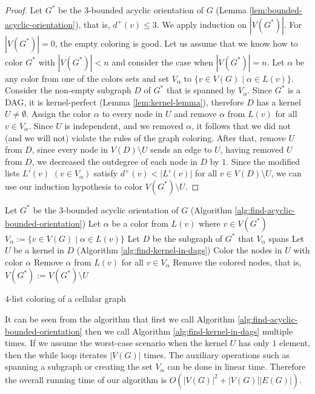 \documentclass[a4paper, 12pt]{article}
\begin{document}
\begin{proof}
Let $G^*$ be the $3$-bounded acyclic orientation of $G$ (Lemma \ref{lem:bounded-acyclic-orientation}), that is, $d^+(v) \leqslant 3$. We apply induction on $|V(G^*)|$. For $|V(G^*)|=0$, the empty coloring is good. Let us assume that we know how to color $G^*$ with $|V(G^*)| < n$ and consider the case when $|V(G^*)|=n$. Let $\alpha$ be any color from one of the colors sets and set $V_\alpha$ to $\lbrace v \in V(G) \mid \alpha \in L(v) \rbrace$. Consider the non-empty subgraph $D$ of $G^*$ that is spanned by $V_\alpha$. Since $G^*$ is a DAG, it is kernel-perfect (Lemma \ref{lem:kernel-lemma}), therefore $D$ has a kernel $U \neq \emptyset$. Assign the color $\alpha$ to every node in $U$ and remove $\alpha$ from $L(v)$ for all $v \in V_\alpha$. Since $U$ is independent, and we removed $\alpha$, it follows that we did not (and we will not) violate the rules of the graph coloring. After that, remove $U$ from $D$, since every node in $V(D) \setminus U$ sends an edge to $U$, having removed $U$ from $D$, we decreased the outdegree of each node in $D$ by $1$. Since the modified lists $L'(v)$ $(v \in V_\alpha)$ satisfy $d^+(v) < |L'(v)|$ for all $v \in V(D) \setminus U$, we can use our induction hypothesis to color $V(G^*) \setminus U$.
\end{proof}
\begin{algorithm}\label{alg:four-list-coloring}
  Let $G^*$ be the $3$-bounded acyclic orientation of $G$ (Algorithm \ref{alg:find-acyclic-bounded-orientation})\;
   {
  	Let $\alpha$ be a color from $L(v)$ where $v \in V(G^*)$\;
  	$V_\alpha := \lbrace v \in V(G) \mid \alpha \in L(v) \rbrace$\;
  	Let $D$ be the subgraph of $G^*$ that $V_\alpha$ spans\;
  	Let $U$ be a kernel in $D$ (Algorithm \ref{alg:find-kernel-in-dags})\;
  	Color the nodes in $U$ with color $\alpha$\;
  	Remove $\alpha$ from $L(v)$ for all $v \in V_\alpha$\;
  	Remove the colored nodes, that is, $V(G^*) := V(G^*) \setminus U$\;
  }
 \caption{$4$-list coloring of a cellular graph}
\end{algorithm}

It can be seen from the algorithm that first we call Algorithm \ref{alg:find-acyclic-bounded-orientation} then we call Algorithm \ref{alg:find-kernel-in-dags} multiple times. If we assume the worst-case scenario when the kernel $U$ has only $1$ element, then the while loop iterates $|V(G)|$ times. The auxiliary operations such as spanning a subgraph or creating the set $V_\alpha$ can be done in linear time. Therefore the overall running time of our algorithm is $O(|V(G)|^2+|V(G)||E(G)|)$.
\end{document}

